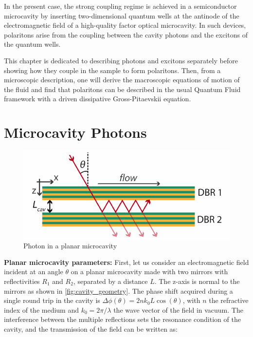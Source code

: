 In the present case, the strong coupling regime is achieved in a semiconductor microcavity by inserting two-dimensional quantum wells at the antinode of the electromagnetic field of a high-quality factor optical microcavity. In such devices, polaritons arise from the coupling between the cavity photons and the excitons of the quantum wells.

This chapter is dedicated to describing photons and excitons separately before showing how they couple in the sample to form polaritons. Then, from a microscopic description, one will derive the macroscopic equations of motion of the fluid and find that polaritons can be described in the usual Quantum Fluid framework with a driven dissipative Gross-Pitaevskii equation.

\section{Microcavity Photons}

\begin{figure}[H]
    \centering
    \includegraphics[width=\textwidth]{chap1/fig/cavity_geometry.pdf}
    \caption{Photon in a planar microcavity}
    \label{fig:cavity_geometry}
\end{figure}

\textbf{Planar microcavity parameters:}
First, let us consider an electromagnetic field incident at an angle $\theta$ on a planar microcavity made with two mirrors with reflectivities $R_1$ and $R_2$, separated by a distance $L$. The z-axis is normal to the mirrors as shown in \autoref{fig:cavity_geometry}. The phase shift acquired during a single round trip in the cavity is $\Delta \phi (\theta)=2nk_0L\cos(\theta)$, with $n$ the refractive index of the medium and $k_0=2\pi/\lambda$ the wave vector of the field in vacuum. The interference between the multiple reflections sets the resonance condition of the cavity, and the transmission of the field can be written as:

